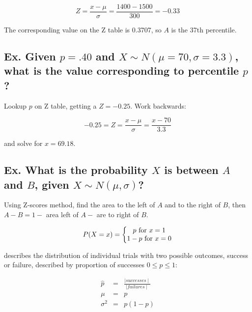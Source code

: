 \begin{equation}
	Z = \frac{x - \mu}{\sigma} = \frac{1400 - 1500}{300} = -0.33
\end{equation}

The corresponding value on the Z table is 0.3707, so $A$ is the 37th percentile.


\subsection*{Ex. Given $p = .40$ and $X \sim N(\mu=70, \sigma=3.3)$, what is the value corresponding to percentile $p$?}

Lookup $p$ on Z table, getting a $Z = -0.25$. Work backwards:

\begin{equation}
	-0.25 = Z = \frac{x - \mu}{\sigma} = \frac{x - 70}{3.3}
\end{equation}

and solve for $x = 69.18$.


\subsection*{Ex. What is the probability $X$ is between $A$ and $B$, given $X \sim N(\mu, \sigma)$?}

Using Z-scores method, find the area to the left of $A$ and to the right of $B$, then $A - B = 1 -$ area left of $A -$ are to right of $B$.
\hformbar




\begin{equation}
	P(X = x) = \left\{\begin{matrix}
					  p ~$for$~ x = 1\\ 
                      1 - p ~$for$~ x =0
                \end{matrix}\right.
\end{equation}

describes the distribution of individual trials with two possible outcomes, success or failure, described by proportion of successes $0 \leq p \leq 1$:

\begin{eqnarray}
  \hat{p}   &=& \frac{\mid successes \mid}{\mid failures \mid} \\
  \mu       &=& p \\
  \sigma^2  &=& p(1 - p)
\end{eqnarray}

